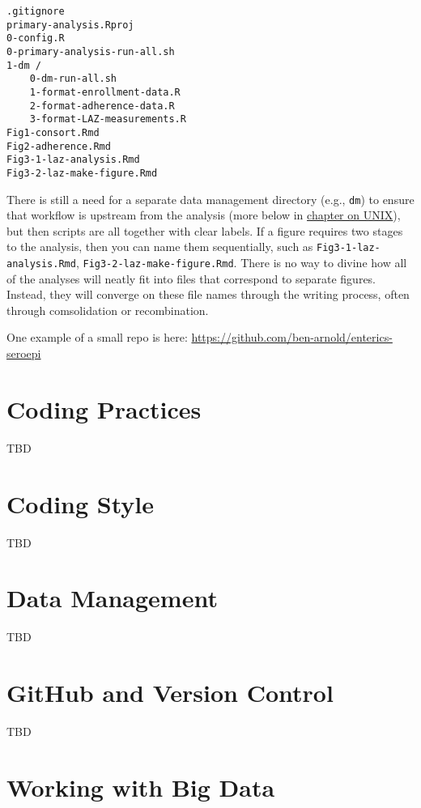 \documentclass[]{book}
\begin{document}
\begin{verbatim}
.gitignore
primary-analysis.Rproj
0-config.R
0-primary-analysis-run-all.sh
1-dm /
    0-dm-run-all.sh
    1-format-enrollment-data.R
    2-format-adherence-data.R
    3-format-LAZ-measurements.R
Fig1-consort.Rmd
Fig2-adherence.Rmd
Fig3-1-laz-analysis.Rmd
Fig3-2-laz-make-figure.Rmd
\end{verbatim}

There is still a need for a separate data management directory (e.g., \texttt{dm}) to ensure that workflow is upstream from the analysis (more below in \protect\hyperlink{unix}{chapter on UNIX}), but then scripts are all together with clear labels. If a figure requires two stages to the analysis, then you can name them sequentially, such as \texttt{Fig3-1-laz-analysis.Rmd}, \texttt{Fig3-2-laz-make-figure.Rmd}. There is no way to divine how all of the analyses will neatly fit into files that correspond to separate figures. Instead, they will converge on these file names through the writing process, often through comsolidation or recombination.

One example of a small repo is here:
\url{https://github.com/ben-arnold/enterics-seroepi}

\hypertarget{codingpractices}{%
\chapter{Coding Practices}\label{codingpractices}}

TBD

\hypertarget{codingstyle}{%
\chapter{Coding Style}\label{codingstyle}}

TBD

\hypertarget{datamanagement}{%
\chapter{Data Management}\label{datamanagement}}

TBD

\hypertarget{github}{%
\chapter{GitHub and Version Control}\label{github}}

TBD

\hypertarget{bigdata}{%
\chapter{Working with Big Data}\label{bigdata}}
\end{document}
